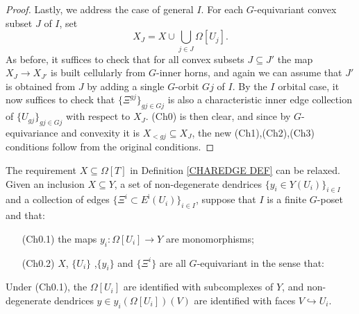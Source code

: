 \documentclass[a4paper,10pt,draft]{article}%
\begin{document}
\begin{proof}
Lastly, we address the case of general $I$.
For each $G$-equivariant convex subset $J$ of $I$, set
\[
	X_J = 
	X \cup \bigcup_{j \in J} \Omega[U_j].
\]
As before, it suffices to check that for all convex subsets
$J \subseteq J'$
the map $X_J \to X_{J'}$ is built cellularly from $G$-inner horns,
and again we can assume that $J'$ is obtained from $J$ by adding a single $G$-orbit $Gj$ of $I$.
By the $I$ orbital case, it now suffices to check that
$\{\Xi^{gj}\}_{gj \in Gj}$ is also a characteristic inner edge collection of $\{U_{g j}\}_{g j \in Gj}$ with respect to $X_J$.
(Ch0) is then clear, and since by $G$-equivariance and convexity it is $X_{<gj} \subseteq X_J$,
the new (Ch1),(Ch2),(Ch3)
conditions follow from the original conditions.
\end{proof}


\begin{remark}\label{CHAREDGE2 REM}
The requirement $X \subseteq \Omega[T]$ in Definition \ref{CHAREDGE DEF} can be relaxed.
Given an inclusion $X \subseteq Y$,
a set of non-degenerate dendrices
$\{y_i \in Y(U_i)\}_{i \in I}$
and a collection of edges
$\{\Xi^i \subset E^{\mathsf{i}}(U_i)\}_{i \in I}$, 
suppose that $I$ is a finite $G$-poset and that:
\begin{itemize}
	\item[(Ch0.1)] the maps $y_i \colon \Omega[U_i] \to Y$ are monomorphisms;
	\item[(Ch0.2)] $X$, $\{U_i\}$ ,$\{y_i\}$ and $\{\Xi^i\}$
	are all $G$-equivariant in the sense that:
\end{itemize}
Under (Ch0.1),
the $\Omega[U_i]$ are identified with subcomplexes of $Y$,
and non-degenerate dendrices $y \in y_i(\Omega[U_i])(V)$
are identified with faces $V \hookrightarrow U_i$.


\end{remark}
\end{document}

